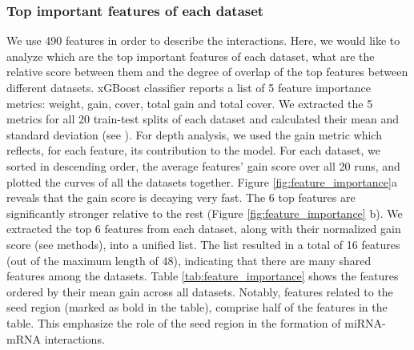 \documentclass{bmcart}
\begin{document}
\subsubsection*{Top important features of each dataset}
We use 490 features in order to describe the interactions. Here, we would like to analyze which are the top important features of each dataset, what are the relative score between them and the degree of overlap of the top features between different datasets. xGBoost classifier reports a list of 5 feature importance metrics: weight, gain, cover, total gain and total cover. We extracted the 5 metrics for all 20 train-test splits of each dataset and calculated their mean and standard deviation (see ).
For depth analysis, we used the gain metric which reflects, for each feature, its contribution to the model. For each dataset, we sorted in descending order, the average features' gain score over all 20 runs, and plotted the curves of all the datasets together.
Figure \ref{fig:feature_importance}a reveals that the gain score is decaying very fast. The 6 top features are significantly stronger relative to the rest (Figure \ref{fig:feature_importance} b). We extracted the top 6 features from each dataset, along with their normalized gain score (see methods), into a unified list. The list resulted in a total of 16 features (out of the maximum length of 48), indicating that there are many shared features among the datasets. Table \ref{tab:feature_importance} shows the features ordered by their mean gain across all datasets.
Notably, features related to the seed region (marked as bold in the table), comprise half of the features in the table. This emphasize the role of the seed region in the formation of miRNA-mRNA interactions.

\end{document}

